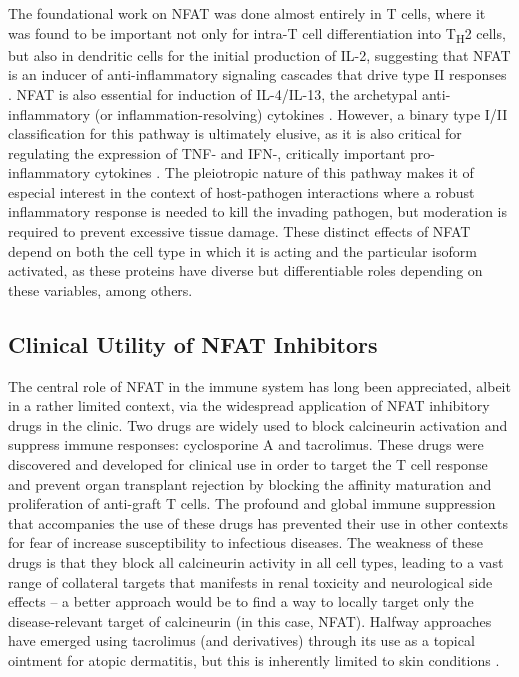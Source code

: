 The foundational work on NFAT was done almost entirely in T cells, where it was found to be important not only for intra-T cell differentiation into T\textsubscript{H}2 cells, but also in dendritic cells for the initial production of IL-2, suggesting that NFAT is an inducer of anti-inflammatory signaling cascades that drive type II responses \citep{Granucci2001, Granucci2003}. NFAT is also essential for induction of IL-4/IL-13, the archetypal anti-inflammatory (or inflammation-resolving) cytokines \citep{Monticelli2004, Agarwal2000, Monticelli2012, Wierenga2002}. However, a binary type I/II classification for this pathway is ultimately elusive, as it is also critical for regulating the expression of TNF-\textalpha{} and IFN-\textgamma, critically important pro-inflammatory cytokines \citep{Kiani2001, Sica1997, Kaminuma2008, Ke2006, Fric2012}. The pleiotropic nature of this pathway makes it of especial interest in the context of host-pathogen interactions where a robust inflammatory response is needed to kill the invading pathogen, but moderation is required to prevent excessive tissue damage. These distinct effects of NFAT depend on both the cell type in which it is acting and the particular isoform activated, as these proteins have diverse but differentiable roles depending on these variables, among others.

\subsection{Clinical Utility of NFAT Inhibitors}\label{tacrolimus}

The central role of NFAT in the immune system has long been appreciated, albeit in a rather limited context, via the widespread application of NFAT inhibitory drugs in the clinic. Two drugs are widely used to block calcineurin activation and suppress immune responses: cyclosporine A and tacrolimus. These drugs were discovered and developed for clinical use in order to target the T cell response and prevent organ transplant rejection by blocking the affinity maturation and proliferation of anti-graft T cells. The profound and global immune suppression that accompanies the use of these drugs has prevented their use in other contexts for fear of increase susceptibility to infectious diseases. The weakness of these drugs is that they block all calcineurin activity in all cell types, leading to a vast range of collateral targets that manifests in renal toxicity and neurological side effects -- a better approach would be to find a way to locally target only the disease-relevant target of calcineurin (in this case, NFAT). Halfway approaches have emerged using tacrolimus (and derivatives) through its use as a topical ointment for atopic dermatitis, but this is inherently limited to skin conditions \citep{Cheer2001, AlDaraji2002}. 

